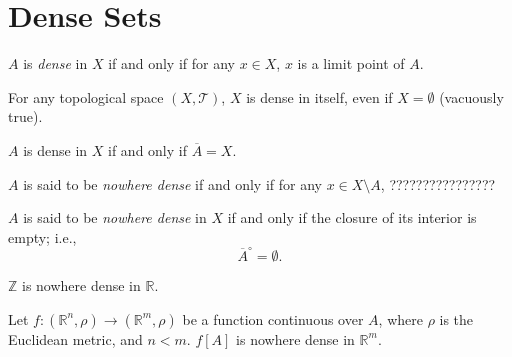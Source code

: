 \begin{proposition}
	
\end{proposition}


\section{Dense Sets}


\begin{definition}
	$A$ is \textit{dense} in $X$ if and only if for any $x \in X$, $x$ is a limit point of $A$.
\end{definition}


\begin{example}
	For any topological space $(X, \mathcal T)$, $X$ is dense in itself, even if $X = \emptyset$ (vacuously true).
\end{example}


\begin{proposition}
	$A$ is dense in $X$ if and only if $\overline A = X$.
\end{proposition}


\begin{definition}
	$A$ is said to be \textit{nowhere dense} if and only if for any $x \in X \setminus A$, ????????????????
\end{definition}


\begin{definition}
	$A$ is said to be \textit{nowhere dense} in $X$ if and only if the closure of its interior is empty; i.e.,
	$$
	\overline{A}^\circ = \emptyset.
	$$
\end{definition}


\begin{example}
	$\mathbb Z$ is nowhere dense in $\mathbb R$.
\end{example}


\begin{example}
	Let $f:(\mathbb R^n, \rho) \to (\mathbb R^{m}, \rho)$ be a function continuous over $A$, where $\rho$ is the Euclidean metric, and $n < m$. $f[A]$ is nowhere dense in $\mathbb R^{m}$.
\end{example}






















%